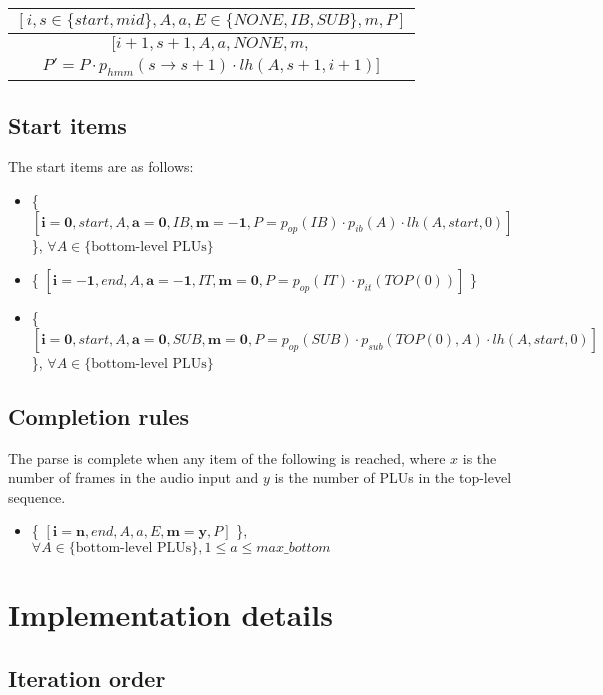 \documentclass[12pt,letterpaper]{article}
\newcommand{\myrule}[2]{\begin{tabular}{c}
#1 \\
\hline
#2
\end{tabular}}
\newcommand{\toprulecomp}[7]{
    $[#1, #2, #3, #4, #5, #6, #7 ]$
}
\newcommand{\botrulecomp}[7]{
    $[#1, #2, #3, #4, #5, #6,$ \\
    $#7 ]$
}
\begin{document}
\myrule{
	\toprulecomp{i}{s\in\{start,mid\}}{A}{a}{E\in\{NONE,IB,SUB\}}{m}{P}
	}
	{
	\botrulecomp{i+1}{s+1}{A}{a}{NONE}{m}{P'= P \cdot p_{hmm}(s \rightarrow s+1) \cdot lh(A,s+1,i+1)}
	}
	
\subsection{Start items}

The start items are as follows:	

\begin{itemize}
\item \{\toprulecomp{\mathbf{i=0}}{start}{A}{\mathbf{a=0}}{IB}{\mathbf{m=-1}}{P= p_{op}(IB) \cdot p_{ib}(A) \cdot lh(A,start,0)}\},
$\forall A\in \{\text{bottom-level PLUs}\}$

\item \{\toprulecomp{\mathbf{i=-1}}{end}{A}{\mathbf{a=-1}}{IT}{\mathbf{m=0}}{P= p_{op}(IT) \cdot p_{it}(TOP(0))}\}

\item \{\toprulecomp{\mathbf{i=0}}{start}{A}{\mathbf{a=0}}{SUB}{\mathbf{m=0}}{P= p_{op}(SUB) \cdot p_{sub}(TOP(0),A) \cdot lh(A,start,0)}\}, \newline
$\forall A\in \{\text{bottom-level PLUs}\}$
\end{itemize}
	
\subsection{Completion rules}

The parse is complete when any item of the following is reached, where $x$ is the number of frames in the audio input and $y$ is the number of PLUs in the top-level sequence.

\begin{itemize}
\item \{\toprulecomp{\mathbf{i=n}}{end}{A}{a}{E}{\mathbf{m=y}}{P}\}, $\forall A\in \{\text{bottom-level PLUs}\}, 1\leq a\leq max\_bottom$
\end{itemize}

\section{Implementation details}

\subsection{Iteration order}
\end{document}
